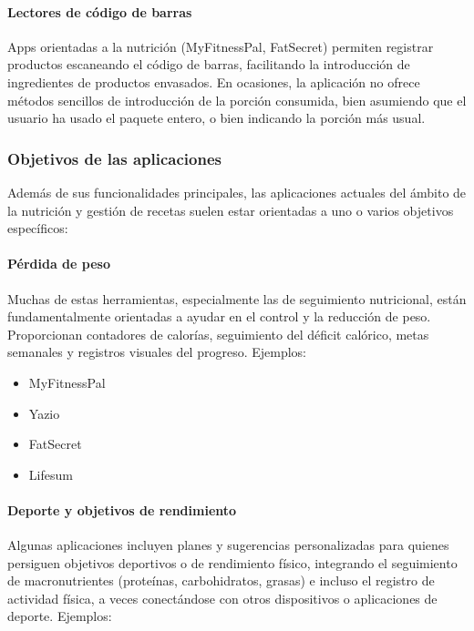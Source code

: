 \paragraph*{Lectores de código de barras}
Apps orientadas a la nutrición (MyFitnessPal, FatSecret) permiten registrar productos escaneando el código de barras, facilitando la introducción de ingredientes de productos envasados. En ocasiones, la aplicación no ofrece métodos sencillos de introducción de la porción consumida, bien asumiendo que el usuario ha usado el paquete entero, o bien indicando la porción más usual.

\subsubsection*{Objetivos de las aplicaciones}

Además de sus funcionalidades principales, las aplicaciones actuales del ámbito de la nutrición y gestión de recetas suelen estar orientadas a uno o varios objetivos específicos:

\paragraph*{Pérdida de peso}
Muchas de estas herramientas, especialmente las de seguimiento nutricional, están fundamentalmente orientadas a ayudar en el control y la reducción de peso. Proporcionan contadores de calorías, seguimiento del déficit calórico, metas semanales y registros visuales del progreso. Ejemplos:

\begin{itemize}
	\item MyFitnessPal
	\item Yazio
	\item FatSecret
	\item Lifesum
\end{itemize}

\paragraph*{Deporte y objetivos de rendimiento}
Algunas aplicaciones incluyen planes y sugerencias personalizadas para quienes persiguen objetivos deportivos o de rendimiento físico, integrando el seguimiento de macronutrientes (proteínas, carbohidratos, grasas) e incluso el registro de actividad física, a veces conectándose con otros dispositivos o aplicaciones de deporte. Ejemplos:

